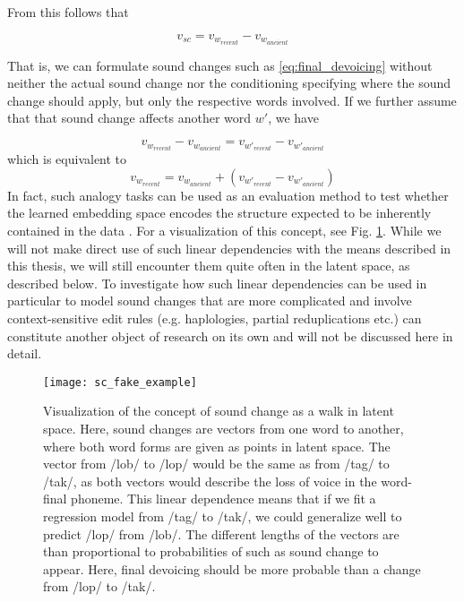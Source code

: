 \documentclass[6pt]{article}
\begin{document}
From this follows that 

\begin{equation}
v_{sc} =  v_{w_{recent}} - v_{w_{ancient}} 
\end{equation}

That is, we can formulate sound changes such as \ref{eq:final_devoicing} without neither the actual sound change nor the conditioning specifying where the sound change should apply, but only the respective words involved.
If we further assume that that sound change affects another word $w'$, we have

\begin{equation}
v_{w_{recent}} - v_{w_{ancient}}  =  v_{w'_{recent}} - v_{w'_{ancient}} 
\end{equation}
which is equivalent to
\begin{equation}
v_{w_{recent}}  =   v_{w_{ancient}}  + (v_{w'_{recent}} - v_{w'_{ancient}}) 
\end{equation}
In fact, such analogy tasks can be used as an evaluation method to test whether the learned embedding space encodes the structure expected to be inherently contained in the data \citep{mikolov2013distributed}. For a visualization of this concept, see Fig. \ref{fig:final_devoicing}. While we will not make direct use of such linear dependencies with the means described in this thesis, we will still encounter them quite often in the latent space, as described below. To investigate how such linear dependencies can be used in particular to model sound changes that are more complicated and involve context-sensitive edit rules (e.g. haplologies, partial reduplications etc.) can constitute another object of  research on its own and will not be discussed here in detail. 
 
 \begin{figure}[h]
\begin{center}
\texttt{[image: sc\_fake\_example]} 
\caption{Visualization of the concept of sound change as a walk in latent space. Here, sound changes are vectors from one word to another, where both word forms are given as points in latent space. The vector from /lob/ to /lop/ would be the same as from /tag/ to /tak/, as both vectors would describe the loss of voice in the word-final phoneme. This linear dependence means that if we fit a regression model from /tag/ to /tak/, we could generalize well to predict /lop/ from /lob/. The different lengths of the vectors are than proportional to probabilities of such as sound change to appear. Here, final devoicing should be more probable than a change from /lop/ to /tak/. }
\label{fig:final_devoicing}
\end{center}
\end{figure}
\end{document}
